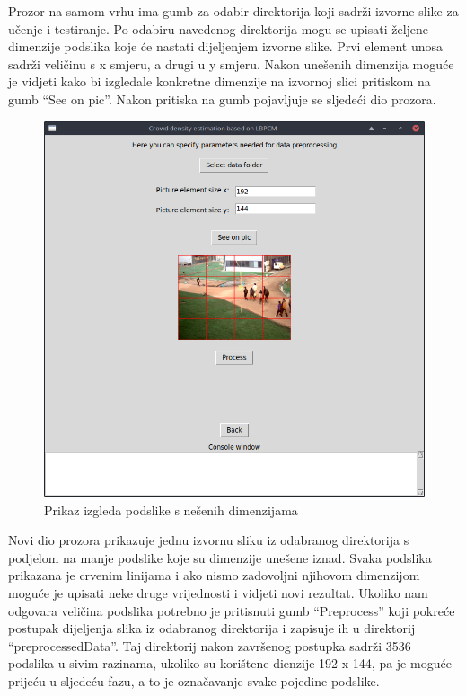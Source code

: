 \documentclass[times, utf8, zavrsni]{fer}
\begin{document}
\bigbreak

Prozor na samom vrhu ima gumb za odabir direktorija koji sadrži izvorne slike
za učenje i testiranje. Po odabiru navedenog direktorija mogu se upisati 
željene dimenzije podslika koje će nastati dijeljenjem izvorne slike.
Prvi element unosa sadrži veličinu s x smjeru, a drugi u y smjeru. Nakon
unešenih dimenzija moguće je vidjeti kako bi izgledale konkretne dimenzije
na izvornoj slici pritiskom na gumb \enquote{See on pic}. Nakon pritiska na gumb
pojavljuje se sljedeći dio prozora.

\begin{figure}[ht]
\centering
\includegraphics[scale=0.4]{img/seeonpic.png}
\caption{Prikaz izgleda podslike s nešenih dimenzijama}
\end{figure}

Novi dio prozora prikazuje jednu izvornu sliku iz odabranog direktorija
s podjelom na manje podslike koje su dimenzije unešene iznad. Svaka podslika
prikazana je crvenim linijama i ako nismo zadovoljni njihovom dimenzijom
moguće je upisati neke druge vrijednosti i vidjeti novi rezultat. Ukoliko 
nam odgovara veličina podslika potrebno je pritisnuti gumb \enquote{Preprocess}
koji pokreće postupak dijeljenja slika iz odabranog direktorija i zapisuje ih u 
direktorij \enquote{preprocessedData}. Taj direktorij nakon završenog postupka
sadrži 3536 podslika u sivim razinama, ukoliko su korištene dienzije 192 x 144, 
pa je moguće prijeću u sljedeću fazu, a to je označavanje svake pojedine podslike.
\end{document}
